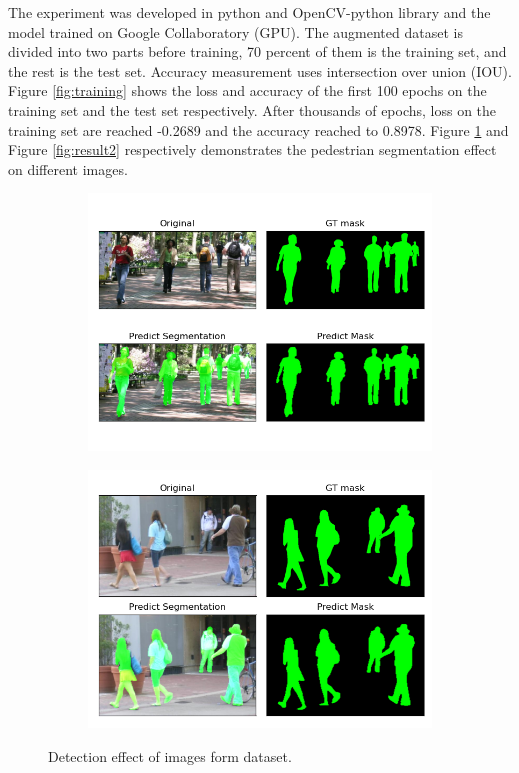 \documentclass[12pt, a4paper]{article}
\begin{document}
	The experiment was developed in python and OpenCV-python library and the model trained on Google Collaboratory (GPU). The augmented dataset is divided into two parts before training, 70 percent of them is the training set, and the rest is the test set. Accuracy measurement uses intersection over union (IOU). Figure \ref{fig:training} shows the loss and accuracy of the first 100 epochs on the training set and the test set respectively. After thousands of epochs, loss on the training set are reached -0.2689 and the accuracy reached to 0.8978. Figure \ref{fig:result1} and Figure \ref{fig:result2} respectively demonstrates the pedestrian segmentation effect on different images.
	\begin{figure}[h!]
	  \centering
	  \begin{subfigure}[b]{0.45\linewidth}
	    \includegraphics[width=\linewidth]{predictMask1.png}
	  \end{subfigure}
	  \begin{subfigure}[b]{0.45\linewidth}
	    \includegraphics[width=\linewidth]{predictMask2.png}
	  \end{subfigure}
	  \caption{Detection effect of images form dataset.}
	  \label{fig:result1}
	\end{figure}
\end{document}
